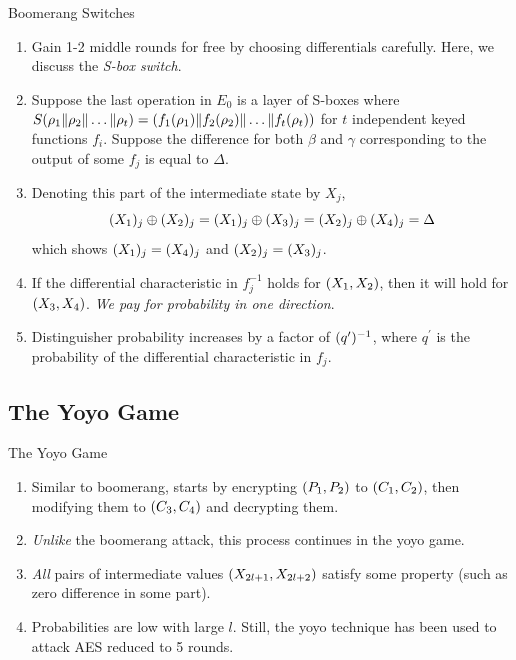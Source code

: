 \documentclass[notheorems]{beamer}
\theoremstyle{definition}
\theoremstyle{example}
\begin{document}
    \begin{frame}[<+->]{Boomerang Switches}
        \begin{enumerate}
            \item Gain 1-2 middle rounds for free by choosing differentials 
            carefully. Here, we discuss the \emph{S-box switch}.
            \item Suppose the last operation in \(E_0\) is a layer of S-boxes 
            where \(S(\rho_1\|\rho_2\|\ldots\|\rho_t) = 
            (f_1(\rho_1)\|f_2(\rho_2)\|\ldots\|f_t(\rho_t))\)             
            for \(t\) independent keyed functions \(f_i\). Suppose the 
            difference for both \(\beta\) and \(\gamma\) corresponding to the 
            output of some \(f_j\) is equal to \(\Delta\). 
            \item Denoting this part of the intermediate state by \(X_j\),
            \begin{equation}
                (X_1)_j \oplus (X_2)_j = (X_1)_j \oplus (X_3)_j = (X_2)_j \oplus (X_4)_j = \Delta
                \label{eq:s-switch}
            \end{equation}
            which shows \((X_1)_j = (X_4)_j\) and \((X_2)_j = 
            (X_3)_j\).
            \item If the differential characteristic in \(f_j^{-1}\) holds for 
            \((X_1, X_2)\), then it will hold for \((X_3, X_4)\).
            \emph{We pay for probability in one direction}.
            \item Distinguisher probability increases by a factor of
            \((q^\prime)^{-1}\), where \(q^\prime\) is the probability of
            the differential characteristic in \(f_j\).
        \end{enumerate}
    \end{frame}

    \subsection{The Yoyo Game}
    \label{subsec:yoyo-game}
    
    \begin{frame}[<+->]{The Yoyo Game}
        \begin{enumerate}
            \item Similar to boomerang, starts by encrypting 
            \((P_1, P_2)\) to \((C_1, C_2)\), then modifying them to
            \((C_3, C_4)\) and decrypting them.
            \item \emph{Unlike} the boomerang attack, this process continues in
            the yoyo game.
            \item \emph{All} pairs of intermediate values 
            \((X_{2l + 1}, X_{2l + 2})\) satisfy some property (such as 
            zero difference in some part).
            \item Probabilities are low with large \(l\). Still, the yoyo 
            technique has been used to attack AES reduced to 5 rounds.
        \end{enumerate}
    \end{frame}
\end{document}
